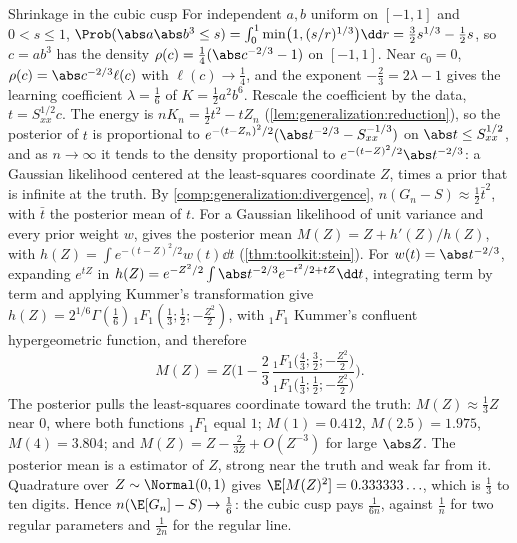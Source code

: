 \begin{refsection}
\begin{computation}{Shrinkage in the cubic cusp}\label{comp:generalization:cusp}
\step For independent $a,b$ uniform on $[-1,1]$ and $0<s\le1$, $\Prob(\abs a\abs b^3\le s)=\int_0^1\min\bigl(1,(s/r)^{1/3}\bigr)\dd r=\frac32s^{1/3}-\frac12s$, so $c=ab^3$ has the density $\rho(c)=\frac14(\abs c^{-2/3}-1)$ on $[-1,1]$. Near $c_0=0$, $\rho(c)=\abs c^{-2/3}\ell(c)$ with $\ell(c)\to\frac14$, and the exponent $-\frac23=2\lambda-1$ gives the learning coefficient $\lambda=\frac16$ of $K=\frac12a^2b^6$.
\step Rescale the coefficient by the data, $t=S_{xx}^{1/2}c$. The energy is $nK_n=\frac12t^2-tZ_n$ (\cref{lem:generalization:reduction}), so the posterior of $t$ is proportional to $e^{-(t-Z_n)^2/2}(\abs t^{-2/3}-S_{xx}^{-1/3})$ on $\abs t\le S_{xx}^{1/2}$, and as $n\to\infty$ it tends to the density proportional to $e^{-(t-Z)^2/2}\abs t^{-2/3}$: a Gaussian likelihood centered at the least-squares coordinate $Z$, times a prior that is infinite at the truth. By \cref{comp:generalization:divergence}, $n(G_n-S)\approx\frac12\bar t^2$, with $\bar t$ the posterior mean of $t$.
\step For a Gaussian likelihood of unit variance and every prior weight $w$,  \parencite{Robbins1956,Efron2011} gives the posterior mean $M(Z)=Z+h'(Z)/h(Z)$, with $h(Z)=\int e^{-(t-Z)^2/2}w(t)\dd t$ (\cref{thm:toolkit:stein}). For $w(t)=\abs t^{-2/3}$, expanding $e^{tZ}$ in $h(Z)=e^{-Z^2/2}\int\abs t^{-2/3}e^{-t^2/2+tZ}\dd t$, integrating term by term and applying Kummer's transformation give $h(Z)=2^{1/6}\Gamma(\frac16)\,{}_1F_1(\frac13;\frac12;-\frac{Z^2}2)$, with ${}_1F_1$ Kummer's confluent hypergeometric function, and therefore
\[
M(Z)=Z\Biggl(1-\frac23\,\frac{{}_1F_1\bigl(\frac43;\frac32;-\frac{Z^2}2\bigr)}{{}_1F_1\bigl(\frac13;\frac12;-\frac{Z^2}2\bigr)}\Biggr).
\]
\step The posterior pulls the least-squares coordinate toward the truth: $M(Z)\approx\frac13Z$ near $0$, where both functions ${}_1F_1$ equal $1$; $M(1)=0.412$, $M(2.5)=1.975$, $M(4)=3.804$; and $M(Z)=Z-\frac2{3Z}+O(Z^{-3})$ for large $\abs Z$. The posterior mean is a  estimator of $Z$, strong near the truth and weak far from it.
\step Quadrature over $Z\sim\Normal(0,1)$ gives $\E[M(Z)^2]=0.333333\ldots$, which is $\frac13$ to ten digits. Hence $n(\E[G_n]-S)\to\frac16$: the cubic cusp pays $\frac1{6n}$, against $\frac1n$ for two regular parameters and $\frac1{2n}$ for the regular line.
\end{computation}


\end{refsection}
